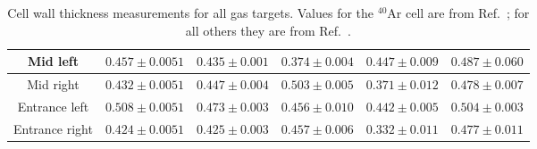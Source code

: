 \documentclass[final,5p,times,twocolumn]{elsarticle}
\begin{document}
\begin{table}[!h]
\begin{adjustbox}{width=1\textwidth}
\begin{tabular}{|c|c|c|c|c|c|}
Mid left             &        $0.457 \pm 0.0051$                                                  & $0.435 \pm 0.001$                                                     & $0.374 \pm 0.004$                                                     & $0.447 \pm 0.009$                                                     & $0.487 \pm 0.060$                                                      \\ \hline
Mid right             &        $0.432 \pm 0.0051$                                                  & $0.447 \pm 0.004$                                                     & $0.503 \pm 0.005$                                                     & $0.371 \pm 0.012$                                                     & $0.478 \pm 0.007$                                                    \\ \hline
Entrance left      &          $0.508 \pm 0.0051$                                                  & $0.473 \pm 0.003$                                                     & $0.456 \pm 0.010$                                                     & $0.442 \pm 0.005$                                                     & $0.504 \pm 0.003$                                                      \\ \hline
Entrance right     &		 $0.424 \pm 0.0051$                             & $0.425 \pm 0.003$                                & 
$0.457 \pm 0.006$                                & 
$0.332 \pm 0.011$                                & 
$0.477 \pm 0.011$                                 \\ \hline
\end{tabular}
\end{adjustbox}
	\caption{Cell wall thickness measurements for all gas targets. Values for the $^{40}$Ar cell are from  Ref.~\cite{ar_config}; for all 
    others they are from Ref.~\cite{cellconfig}.}
	\label{tab:cell}
\end{table}
\end{document}
